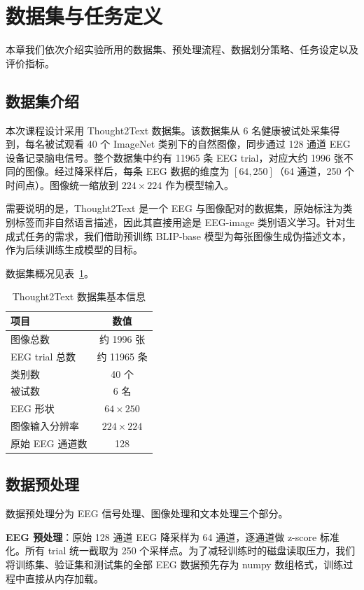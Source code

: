 \section{数据集与任务定义}

本章我们依次介绍实验所用的数据集、预处理流程、数据划分策略、任务设定以及评价指标。

\subsection{数据集介绍}

本次课程设计采用 Thought2Text 数据集。该数据集从 6 名健康被试处采集得到，每名被试观看 40 个 ImageNet 类别下的自然图像，同步通过 128 通道 EEG 设备记录脑电信号。整个数据集中约有 11965 条 EEG trial，对应大约 1996 张不同的图像。经过降采样后，每条 EEG 数据的维度为 $[64, 250]$（64 通道，250 个时间点）。图像统一缩放到 $224\times224$ 作为模型输入。

需要说明的是，Thought2Text 是一个 EEG 与图像配对的数据集，原始标注为类别标签而非自然语言描述，因此其直接用途是 EEG-image 类别语义学习。针对生成式任务的需求，我们借助预训练 BLIP-base 模型为每张图像生成伪描述文本，作为后续训练生成模型的目标。

数据集概况见表~\ref{tab:dataset}。

\begin{table}[htbp]
  \centering
  \caption{Thought2Text 数据集基本信息}
  \label{tab:dataset}
  \begin{tabular}{l c}
    \toprule
    项目 & 数值 \\
    \midrule
    图像总数 & 约 1996 张 \\
    EEG trial 总数 & 约 11965 条 \\
    类别数 & 40 个 \\
    被试数 & 6 名 \\
    EEG 形状 & $64\times250$ \\
    图像输入分辨率 & $224\times224$ \\
    原始 EEG 通道数 & 128 \\
    \bottomrule
  \end{tabular}
\end{table}

\subsection{数据预处理}

数据预处理分为 EEG 信号处理、图像处理和文本处理三个部分。

\textbf{EEG 预处理}：原始 128 通道 EEG 降采样为 64 通道，逐通道做 z-score 标准化。所有 trial 统一截取为 250 个采样点。为了减轻训练时的磁盘读取压力，我们将训练集、验证集和测试集的全部 EEG 数据预先存为 numpy 数组格式，训练过程中直接从内存加载。

